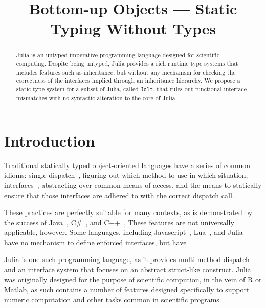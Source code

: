 \documentclass[preprint]{sigplanconf}
\newcommand{\xt}[1]{\texttt{#1}}
\newcommand{\jolt}{\xt{Jolt}}
\begin{document}
\title{Bottom-up Objects --- Static Typing Without Types} 
\maketitle

\begin{abstract}
Julia is an untyped imperative programming language designed for scientific computing. 
Despite being untyped, Julia provides a rich runtime type systems that includes features such as  
inheritance, but without any mechanism for checking the correctness of the interfaces implied 
through an inheritance hierarchy. We propose a static type system for a 
subset of Julia, called \jolt, that rules out functional interface mismatches
with no syntactic alteration to the core of Julia.
\end{abstract}


\section{Introduction}

Traditional statically typed object-oriented languages have a series of
common idioms: single dispatch~\cite{jls}, figuring out which method
to use in which situation, interfaces~\cite{objinter, fj}, abstracting over 
common means of access, and the means to statically
ensure that those interfaces are adhered to with the correct dispatch call.

These practices are perfectly suitable for many contexts,
as is demonstrated by the success of Java~\cite{jls}, C\#~\cite{csls}, and C++~\cite{cppls}, 
These features are not universally applicable, however. Some languages, including
Javascript~\cite{ecma}, Lua~\cite{lualang}, and Julia~\cite{bezan} have no mechanism to define enforced
interfaces, but have 


Julia is one such programming language, as it provides multi-method dispatch 
and an interface system that focuses on an abstract struct-like construct. 
Julia was originally designed for the purpose of scientific compution, in the vein of 
R or Matlab\cite{bezan}, as such contains a number of features designed specifically to support 
numeric computation and other tasks common in scientific programs.
\end{document}

